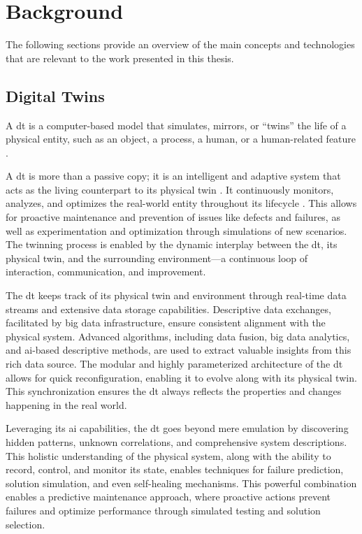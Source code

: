\chapter{Background}\label{ch:background}

The following sections provide an overview of the main concepts and technologies that are relevant to the work presented in this thesis.

\section{Digital Twins}

A \acrfull{dt} is a computer-based model that simulates, mirrors, or ``twins'' the life of a physical entity, such as an object, a process, a human, or a human-related feature \parencite{barricelliMultiModalApproachCreating2022}.

A \acrshort{dt} is more than a passive copy; it is an intelligent and adaptive system that acts as the living counterpart to its physical twin \parencite{grievesDigitalTwinManufacturing2014,kritzingerDigitalTwinManufacturing2018}. It continuously  monitors, analyzes, and optimizes the real-world entity throughout its lifecycle \parencite{negriReviewRolesDigital2017}. This allows for proactive maintenance and prevention of issues like defects and failures, as well as experimentation and optimization through simulations of new scenarios. The twinning process is enabled by the dynamic interplay between the \acrshort{dt}, its physical twin, and the surrounding environment---a continuous loop of interaction, communication, and improvement.

The \acrshort{dt} keeps track of its physical twin and environment through real-time data streams and extensive data storage capabilities. Descriptive data exchanges, facilitated by big data infrastructure, ensure consistent alignment with the physical system. Advanced algorithms, including data fusion, big data analytics, and \acrshort{ai}-based descriptive methods, are used to extract valuable insights from this rich data source. The modular and highly parameterized architecture of the \acrshort{dt} allows for quick reconfiguration, enabling it to evolve along with its physical twin. This synchronization ensures the \acrshort{dt} always reflects the properties and changes happening in the real world.

Leveraging its \acrshort{ai} capabilities, the \acrshort{dt} goes beyond mere emulation by discovering hidden patterns, unknown correlations, and comprehensive system descriptions. This holistic understanding of the physical system, along with the ability to record, control, and monitor its state, enables techniques for failure prediction, solution simulation, and even self-healing mechanisms. This powerful combination enables a predictive maintenance approach, where proactive actions prevent failures and optimize performance through simulated testing and solution selection.

